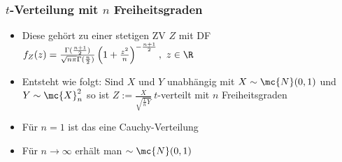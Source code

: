 \subsubsection{$t$-Verteilung mit $n$ Freiheitsgraden}
\begin{itemize}
    \item Diese gehört zu einer stetigen ZV $Z$ mit DF $f_Z(z) = \frac{\Gamma(\frac{n + 1}{2})}{\sqrt{n \pi} \Gamma(\frac{n}{2})} \left( 1 + \frac{z^2}{n}\right)^{- \frac{n + 1}{2}}, \ z \in \R$
    \item Entsteht wie folgt: Sind $X$ und $Y$ unabhängig mit $X \sim \mc{N}(0, 1)$ und $Y \sim \mc{X}_n^2$ so ist $Z := \frac{X}{\sqrt{\frac{1}{n} Y}} \ t$-verteilt mit $n$ Freiheitsgraden
    \item Für $n = 1$ ist das eine Cauchy-Verteilung
    \item Für $n \to \infty$ erhält man $\sim \mc{N}(0, 1)$
\end{itemize}

